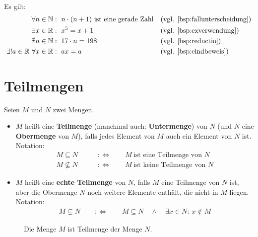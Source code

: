 \begin{bsp}[*]
    Es gilt:
    \begin{align*}
        \forall n\in \N &:\ n\cdot (n+1)\ \text{ist eine gerade Zahl} && (\text{vgl. \cref{bsp:fallunterscheidung}})\\
        \exists x\in \R &:\ x^5 = x+1 && (\text{vgl. \cref{bsp:exverwendung}})\\
        \nexists n\in \N &:\ 17\cdot n = 198 && (\text{vgl. \cref{bsp:reductio}})\\ 
        \exists ! a\in \R \ \forall x\in \R & :\ ax=a &&(\text{vgl. \cref{bsp:eindbeweis}})
    \end{align*}
\end{bsp}





\section{Teilmengen}


\begin{defin}[Teilmenge] \label{def:teilmenge} 
    Seien $M$ und $N$ zwei Mengen.
    \begin{itemize}
        \item $M$ heißt eine \textbf{Teilmenge} (manchmal auch: \textbf{Untermenge}) von $N$ (und $N$ eine \textbf{Obermenge} von $M$), falls jedes Element von $M$ auch ein Element von $N$ ist. Notation:
        \begin{align*}
            M \subseteq N \qquad &:\Leftrightarrow\qquad M\ \text{ist eine Teilmenge von $N$} \\
            M \nsubseteq N \qquad &:\Leftrightarrow\qquad M\ \text{ist keine Teilmenge von $N$}
        \end{align*}
        \item $M$ heißt eine \textbf{echte Teilmenge} von $N$, falls $M$ eine Teilmenge von $N$ ist, aber die Obermenge $N$ noch weitere Elemente enthält, die nicht in $M$ liegen. Notation:
        \begin{align*}
            M\subsetneq N \qquad:\Leftrightarrow\qquad M\subseteq N\quad \land\quad \exists x\in N:\ x\notin M
        \end{align*}
    \end{itemize}
\end{defin}


\begin{figure}[ht]
    \centering \caption{Die Menge $M$ ist Teilmenge der Menge $N$.}
\end{figure}



